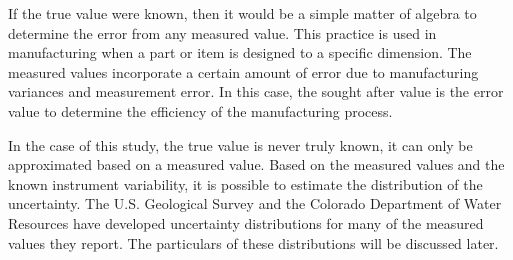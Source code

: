 \begin{linenumbers}
If the true value were known, then it would be a simple matter of algebra to determine the error from any measured value.  This practice is used in manufacturing when a part or item is designed to a specific dimension.  The measured values incorporate a certain amount of error due to manufacturing variances and measurement error.  In this case, the sought after value is the error value to determine the efficiency of the manufacturing process.

In the case of this study, the true value is never truly known, it can only be approximated based on a measured value.  Based on the measured values and the known instrument variability, it is possible to estimate the distribution of the uncertainty.  The U.S. Geological Survey and the Colorado Department of Water Resources have developed uncertainty distributions for many of the measured values they report.  The particulars of these distributions will be discussed later.


\end{linenumbers}
